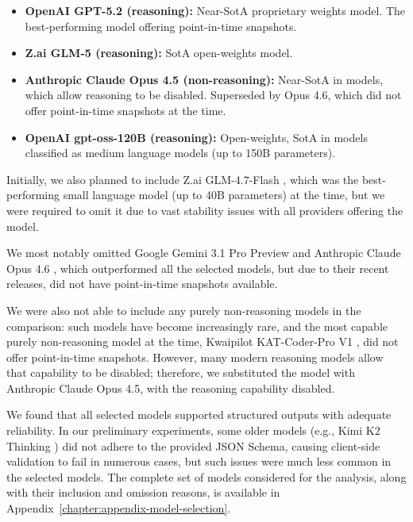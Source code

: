 \begin{itemize}
    \item \textbf{OpenAI GPT-5.2  (reasoning):} Near-SotA proprietary weights model. The best-performing model offering point-in-time snapshots.
    \item \textbf{Z.ai GLM-5  (reasoning):} SotA open-weights model.
    \item \textbf{Anthropic Claude Opus 4.5  (non-reasoning):} Near-SotA in models, which allow reasoning to be disabled. Superseded by Opus 4.6, which did not offer point-in-time snapshots at the time.
    \item \textbf{OpenAI gpt-oss-120B  (reasoning):} Open-weights, SotA in models classified as medium language models (up to \num{150}B parameters).
\end{itemize}

Initially, we also planned to include Z.ai GLM-4.7-Flash , which was the best-performing small language model (up to \num{40}B parameters) at the time, but we were required to omit it due to vast stability issues with all providers offering the model.

We most notably omitted Google Gemini 3.1 Pro Preview  and Anthropic Claude Opus 4.6 , which outperformed all the selected models, but due to their recent releases, did not have point-in-time snapshots available.

We were also not able to include any purely non-reasoning models in the comparison: such models have become increasingly rare, and the most capable purely non-reasoning model at the time, Kwaipilot KAT-Coder-Pro V1 , did not offer point-in-time snapshots. However, many modern reasoning models allow that capability to be disabled; therefore, we substituted the model with Anthropic Claude Opus 4.5, with the reasoning capability disabled.

We found that all selected models supported structured outputs with adequate reliability. In our preliminary experiments, some older models (e.g., Kimi K2 Thinking ) did not adhere to the provided JSON Schema, causing client-side validation to fail in numerous cases, but such issues were much less common in the selected models. The complete set of models considered for the analysis, along with their inclusion and omission reasons, is available in Appendix~\ref{chapter:appendix-model-selection}.

